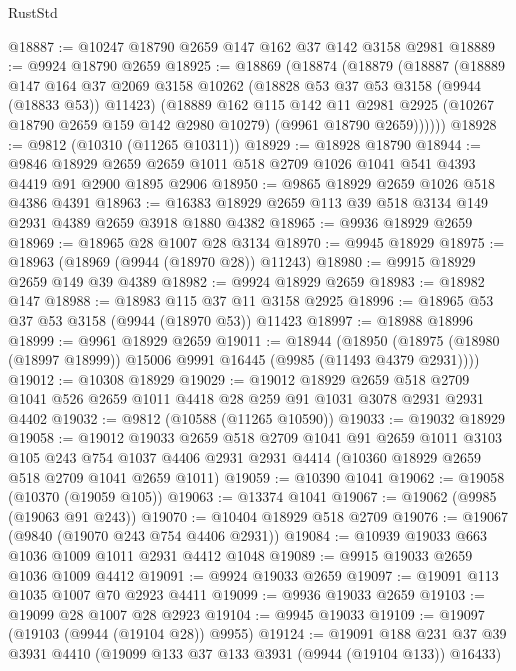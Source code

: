 \begin{lexlean}{RustStd}
\begin{coremodule}
@18887 := @10247 @18790 @2659 @147 @162 @37 @142 @3158 @2981
@18889 := @9924 @18790 @2659
@18925 := @18869
    (@18874
      (@18879
        (@18887
          (@18889
            @147
            @164
            @37
            @2069
            @3158
            @10262
            (@18828 @53 @37 @53 @3158 (@9944 (@18833 @53)) @11423)
            (@18889
              @162
              @115
              @142
              @11
              @2981
              @2925
              (@10267 @18790 @2659 @159 @142 @2980 @10279)
              (@9961 @18790 @2659))))))
@18928 := @9812 (@10310 (@11265 @10311))
@18929 := @18928 @18790
@18944 := @9846
    @18929
    @2659
    @2659
    @1011
    @518
    @2709
    @1026
    @1041
    @541
    @4393
    @4419
    @91
    @2900
    @1895
    @2906
@18950 := @9865 @18929 @2659 @1026 @518 @4386 @4391
@18963 := @16383 @18929 @2659 @113 @39 @518 @3134 @149 @2931 @4389 @2659 @3918 @1880 @4382
@18965 := @9936 @18929 @2659
@18969 := @18965 @28 @1007 @28 @3134
@18970 := @9945 @18929
@18975 := @18963 (@18969 (@9944 (@18970 @28)) @11243)
@18980 := @9915 @18929 @2659 @149 @39 @4389
@18982 := @9924 @18929 @2659
@18983 := @18982 @147
@18988 := @18983 @115 @37 @11 @3158 @2925
@18996 := @18965 @53 @37 @53 @3158 (@9944 (@18970 @53)) @11423
@18997 := @18988 @18996
@18999 := @9961 @18929 @2659
@19011 := @18944
    (@18950 (@18975 (@18980 (@18997 @18999)) @15006 @9991 @16445 (@9985 (@11493 @4379 @2931))))
@19012 := @10308 @18929
@19029 := @19012
    @18929
    @2659
    @518
    @2709
    @1041
    @526
    @2659
    @1011
    @4418
    @28
    @259
    @91
    @1031
    @3078
    @2931
    @2931
    @4402
@19032 := @9812 (@10588 (@11265 @10590))
@19033 := @19032 @18929
@19058 := @19012
    @19033
    @2659
    @518
    @2709
    @1041
    @91
    @2659
    @1011
    @3103
    @105
    @243
    @754
    @1037
    @4406
    @2931
    @2931
    @4414
    (@10360 @18929 @2659 @518 @2709 @1041 @2659 @1011)
@19059 := @10390 @1041
@19062 := @19058 (@10370 (@19059 @105))
@19063 := @13374 @1041
@19067 := @19062 (@9985 (@19063 @91 @243))
@19070 := @10404 @18929 @518 @2709
@19076 := @19067 (@9840 (@19070 @243 @754 @4406 @2931))
@19084 := @10939 @19033 @663 @1036 @1009 @1011 @2931 @4412 @1048
@19089 := @9915 @19033 @2659 @1036 @1009 @4412
@19091 := @9924 @19033 @2659
@19097 := @19091 @113 @1035 @1007 @70 @2923 @4411
@19099 := @9936 @19033 @2659
@19103 := @19099 @28 @1007 @28 @2923
@19104 := @9945 @19033
@19109 := @19097 (@19103 (@9944 (@19104 @28)) @9955)
@19124 := @19091
    @188
    @231
    @37
    @39
    @3931
    @4410
    (@19099 @133 @37 @133 @3931 (@9944 (@19104 @133)) @16433)

\end{coremodule}
\end{lexlean}
